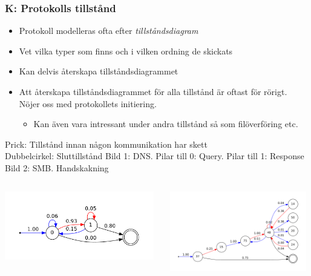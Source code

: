 \documentclass[xetex, 8pt]{beamer}
\begin{document}
    \begin{frame}
        \frametitle{K: Protokolls tillstånd}
        \begin{itemize}
            \item Protokoll modelleras ofta efter \emph{tillståndsdiagram}
            \item Vet vilka typer som finns och i vilken ordning de skickats
            \item Kan delvis återskapa tillståndsdiagrammet
            \item Att återskapa tillståndsdiagrammet för alla tillstånd är
                oftast för rörigt. Nöjer oss med protokollets initiering.
                \begin{itemize}
                    \item Kan även vara intressant under andra tillstånd så
                        som filöverföring etc.
                \end{itemize}
        \end{itemize}
        Prick: Tillstånd innan någon kommunikation har skett\\
        Dubbelcirkel: Sluttillstånd
        \vskip10pt
        Bild 1: DNS. Pilar till 0: Query. Pilar till 1: Response
        \vskip10pt
        Bild 2: SMB. Handskakning
        \begin{columns}[t]
            \begin{column}[T]{5cm}
                \includegraphics[height=3cm]{img/dnsstate.pdf}
            \end{column}
            \begin{column}[T]{6cm}
                \includegraphics[height=3.5cm]{img/smbstate.pdf}
            \end{column}
        \end{columns}

    \end{frame}
\end{document}
